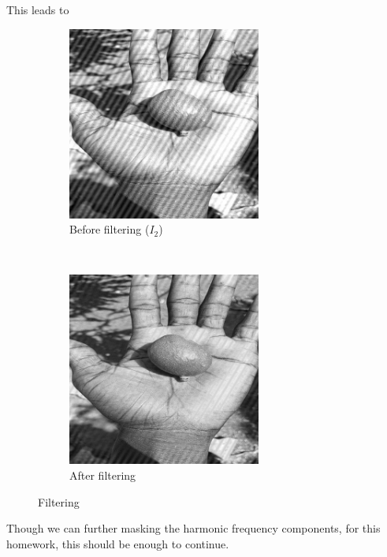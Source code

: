 \documentclass[12pt]{article}
\begin{document}
\noindent
This leads to
\begin{figure}[H]
    \centering
    \begin{subfigure}[t]{0.5\textwidth}
        \centering
        \includegraphics[height=2.5in]{images/stripe_before}
        \caption{Before filtering ($I_2$)}
    \end{subfigure}%
    ~
    \begin{subfigure}[t]{0.5\textwidth}
        \centering
        \includegraphics[height=2.5in]{images/stripe_after}
        \caption{After filtering}
    \end{subfigure}
    \caption{Filtering}
    \label{fig:stripe_filter}
\end{figure}
\noindent
Though we can further masking the harmonic frequency components, for this homework, this should be enough to continue.
\end{document}
